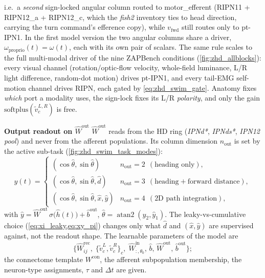\documentclass[11pt]{article}
\def\softplus{\mathrm{softplus}}
\begin{document}
i.e.\ a \emph{second} sign-locked angular column routed to
motor\_efferent (RIPN11 + RIPN12\_a + RIPN12\_c, which the \emph{fish2}
inventory ties to head direction, carrying the turn command's efference
copy), while $v_{\mathrm{fwd}}$ still routes only to pt-IPN1. In the
first model version the two angular columns share a driver,
$\omega_{\mathrm{proprio}}(t)=\omega(t)$, each with its own pair of
scalars. The same rule scales to the full multi-modal driver of the
nine ZAPBench conditions (\cref{fig:zhd_allblocks}): every visual
channel (rotation/optic-flow velocity, whole-field luminance, L/R light
difference, random-dot motion) drives pt-IPN1, and every tail-EMG
self-motion channel drives RIPN, each gated by \cref{eq:zhd_swim_gate}.
Anatomy fixes \emph{which} port a modality uses, the sign-lock fixes its
L/R \emph{polarity}, and only the gain $\softplus(\tilde v_c^{L,R})$ is
free.

\bigskip
\noindent\textbf{Output readout on $\hat W^{\mathrm{out}}$}%
\label{method:output_readout}
$\hat W^{\mathrm{out}}$ reads from the HD ring (\emph{IPNd*},
\emph{IPNds*}, \emph{IPN12 pool}) and never from the afferent
populations. Its column dimension $n_{\mathrm{out}}$ is set by the
active sub-task (\cref{fig:zhd_swim_task_modes}):
\begin{equation}
\hat y(t) =
\begin{cases}
(\cos\hat\theta,\sin\hat\theta)                 & n_{\mathrm{out}}=2 \ \ (\text{heading only}),\\
(\cos\hat\theta,\sin\hat\theta,\hat d)          & n_{\mathrm{out}}=3 \ \ (\text{heading}+\text{forward distance}),\\
(\cos\hat\theta,\sin\hat\theta,\hat x,\hat y)   & n_{\mathrm{out}}=4 \ \ (\text{2D path integration}),
\end{cases}
\label{eq:zhd_readout}
\end{equation}
with $\hat y = \hat W^{\mathrm{out}}\,\sigma\!\big(\hat h(t)\big)+\hat b^{\mathrm{out}}$,
$\hat\theta=\operatorname{atan2}(\hat y_2,\hat y_1)$. The leaky-vs-cumulative choice
(\cref{eq:xi_leaky,eq:xy_pi}) changes only what $\hat d$ and
$(\hat x,\hat y)$ are supervised against, not the readout shape.
The learnable parameters of the model are
\begin{equation*}
\big\{\hat W^{\mathrm{rec}}_{ij},\;
\{\tilde v_c^{L},\tilde v_c^{R}\}_c,\;
\hat W^{\mathrm{in}}_{:,\theta_0},\,\hat b,\,
\hat W^{\mathrm{out}},\,\hat b^{\mathrm{out}}\big\};
\end{equation*}
the connectome template $W^{\mathrm{con}}$, the afferent
subpopulation membership, the neuron-type assignments, $\tau$ and
$\Delta t$ are given.
\end{document}

